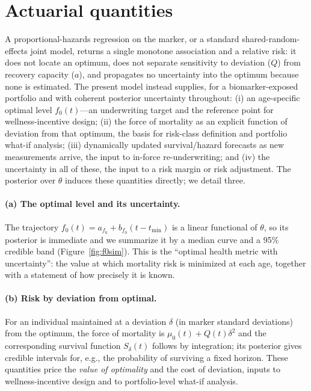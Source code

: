 \documentclass[review,3p,times]{elsarticle}
\newcommand{\fzero}{f_0}
\begin{document}
\section{Actuarial quantities}\label{sec:actuarial}

A proportional-hazards regression on the marker, or a standard
shared-random-effects joint model, returns a single monotone association and a
relative risk: it does not locate an optimum, does not separate sensitivity to
deviation ($Q$) from recovery capacity ($a$), and propagates no uncertainty into
the optimum because none is estimated. The present model instead supplies, for a
biomarker-exposed portfolio and with coherent posterior uncertainty throughout:
(i) an age-specific optimal level $\fzero(t)$---an underwriting target and the
reference point for wellness-incentive design; (ii) the force of mortality as an
explicit function of deviation from that optimum, the basis for risk-class
definition and portfolio what-if analysis; (iii) dynamically updated
survival/hazard forecasts as new measurements arrive, the input to in-force
re-underwriting; and (iv) the uncertainty in all of these, the input to a risk
margin or risk adjustment. The posterior over $\theta$ induces these quantities
directly; we detail three.

\paragraph{(a) The optimal level and its uncertainty.} The trajectory
$\fzero(t)=a_{f_0}+b_{f_0}(t-t_{\min})$ is a linear functional of $\theta$, so its
posterior is immediate and we summarize it by a median curve and a 95\% credible
band (Figure~\ref{fig:f0sim}). This is the ``optimal health metric with
uncertainty'': the value at which mortality risk is minimized at each age, together
with a statement of how precisely it is known.

\paragraph{(b) Risk by deviation from optimal.} For an individual maintained at a
deviation $\delta$ (in marker standard deviations) from the optimum, the force of
mortality is $\mu_0(t)+Q(t)\delta^2$ and the corresponding survival function
$S_\delta(t)$ follows by integration; its posterior gives credible intervals for,
e.g., the probability of surviving a fixed horizon. These quantities price the
\emph{value of optimality} and the cost of deviation, inputs to wellness-incentive
design and to portfolio-level what-if analysis.
\end{document}
